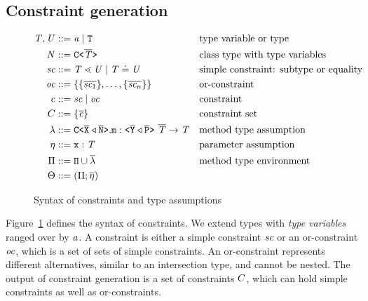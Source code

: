 \documentclass[a4paper,USenglish,cleveref, autoref, thm-restate, anonymous]{lipics-v2021}
\begin{document}
\subsection{Constraint generation}
\label{sec:fjtype}
\begin{figure}[tp]
  \begin{align*}
    \mathit{T}, \mathit{U} &::= \mathit{ a } \mid {\tt T} && \text{type variable or type}\\
    \mathit{N} &::= \mathtt{C \texttt{<} \overline{\mathit{T}} \texttt{>} } && \text{class type with type variables} \\
    \textit{sc} &::= \mathit{T} \lessdot \mathit{U} \mid \mathit{T} \doteq \mathit{U} && \text{simple constraint: subtype or equality}\\
    \textit{oc}{} &::= \{ \{ \overline{\textit{sc}_1} \}, \ldots, \{ \overline{\textit{sc}_n} \} \} && \text{or-constraint}\\
    \mathit{c} &::= \textit{sc} \mid \textit{oc} && \text{constraint}\\
    C &::= \{ \mathit{\overline{c}} \} && \text{constraint set}\\
    \mathtt{\lambda} &::= \mathtt{C \texttt{<} \overline{\tt X} \triangleleft \overline{\tt N} \texttt{>} }.\texttt{m} : \mathtt{ \texttt{<} \overline{\tt Y}
                        \triangleleft \overline{\tt P} \texttt{>} }\ \overline{\tt \mathit{T}} \to \mathit{T}  &&
                                                                \text{method
                                                                type assumption}\\
    \mathtt{\eta} &::= \texttt{x} : \mathit{T} && \text{parameter
                                                       assumption}\\
    \Pi & ::= {\tt \Pi} \cup \overline{\mathtt{\lambda}} &
                & \text{method type environment} \\
    \Theta &::= ({\Pi} ; \overline{\mathtt{\eta}}) 
  \end{align*}
  \caption{Syntax of constraints and type assumptions}
  \label{fig:syntax-constraints}
\end{figure}

Figure~\ref{fig:syntax-constraints} defines the syntax of
constraints. We extend types with \emph{type variables} ranged over by
$\mathit{ a }$. A constraint is either a simple constraint $\textit{sc}$ or
an or-constraint $\textit{oc}$, which is a set of sets of simple
constraints. An or-constraint represents different alternatives,
similar to an intersection type, and
cannot be nested. The output of constraint generation is a set of
constraints $C$, which can hold simple constraints as well as or-constraints.
\end{document}
